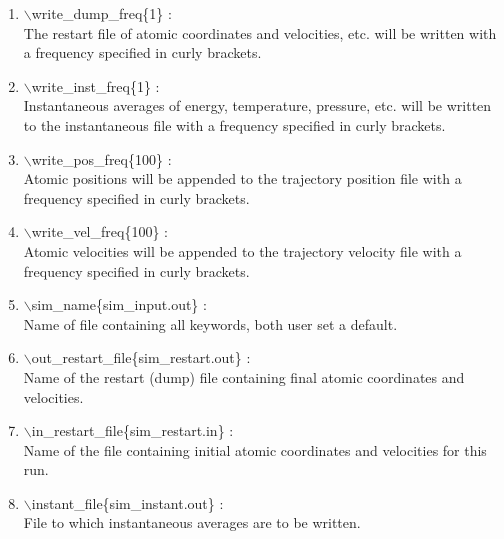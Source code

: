 \begin{itemize}
\begin{enumerate}
 \vspace{0.15in} \Large
 \item   $\backslash$write\_dump\_freq\{1\} : \\
   \large
     The restart file of atomic coordinates and velocities, etc. will be
     written with a frequency specified in curly brackets.

 \vspace{0.15in}\Large
 \item   $\backslash$write\_inst\_freq\{1\} : \\
   \large
     Instantaneous averages of energy, temperature, pressure, etc. will be 
     written to the instantaneous file with a frequency specified in curly 
     brackets.

 \vspace{0.15in} \Large
 \item   $\backslash$write\_pos\_freq\{100\} : \\
  \large
    Atomic positions will be appended to the trajectory position file with
    a frequency specified in curly brackets.

 \vspace{0.15in} \Large
 \item   $\backslash$write\_vel\_freq\{100\} : \\
  \large
    Atomic velocities will be appended to the trajectory velocity file with
    a frequency specified in curly brackets.

 \vspace{0.15in} \Large
 \item   $\backslash$sim\_name\{sim\_input.out\} : \\
   \large
     Name of file containing all keywords, both user set a default.

 \vspace{0.15in} \Large
 \item   $\backslash$out\_restart\_file\{sim\_restart.out\} : \\
   \large Name of the restart (dump) file containing final atomic 
          coordinates and velocities.

 \vspace{0.15in} \Large
 \item   $\backslash$in\_restart\_file\{sim\_restart.in\} : \\
   \large
     Name of the file containing initial atomic coordinates and
     velocities for this run.


 \vspace{0.15in} \Large
 \item   $\backslash$instant\_file\{sim\_instant.out\} : \\
   \large
     File to which instantaneous averages are to be written.


\end{enumerate}
\end{itemize}
